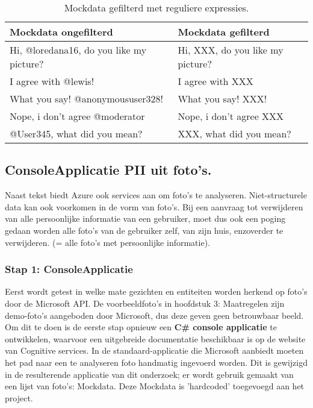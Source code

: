   \begin{table}
      
      \begin{tabularx}{\linewidth}{ |X|l| } 
          
          \hline
          Mockdata ongefilterd & Mockdata gefilterd \\

          \hline\hline
          Hi, @loredana16, do you like my picture?  & Hi, XXX, do you like my picture? \\
          I agree with @lewis! & I agree with XXX \\
          What you say! @anonymoususer328! & What you say! XXX! \\
          Nope, i don't agree @moderator & Nope, i don't agree XXX \\
          @User345, what did you mean? &   XXX, what did you mean?\\
          \hline
          
      \end{tabularx}
      \caption{Mockdata gefilterd met reguliere expressies.} 
  \end{table}



\subsection{ConsoleApplicatie PII uit foto's.}
Naast tekst biedt Azure ook services aan om foto's te analyseren. Niet-structurele data kan ook voorkomen in de vorm van foto's. Bij een aanvraag tot verwijderen van alle persoonlijke informatie van een gebruiker, moet dus ook een poging gedaan worden alle foto's van de gebruiker zelf, van zijn huis, enzoverder te verwijderen. (= alle foto's met persoonlijke informatie). 

\subsubsection{Stap 1: ConsoleApplicatie}

Eerst wordt getest in welke mate gezichten en entiteiten worden herkend op foto's door de Microsoft API. De voorbeeldfoto's in hoofdstuk 3: Maatregelen zijn demo-foto's aangeboden door Microsoft, dus deze geven geen betrouwbaar beeld. \\
Om dit te doen is de eerste stap opnieuw een \textbf{C\# console applicatie} te ontwikkelen, waarvoor een uitgebreide documentatie beschikbaar is op de website van Cognitive services. 
In de standaard-applicatie die Microsoft aanbiedt moeten het pad naar een te analyseren foto handmatig ingevoerd worden. 
Dit is gewijzigd in de resulterende applicatie van dit onderzoek; er wordt gebruik gemaakt van een lijst van foto's: Mockdata. Deze Mockdata is 'hardcoded' toegevoegd aan het project. 

